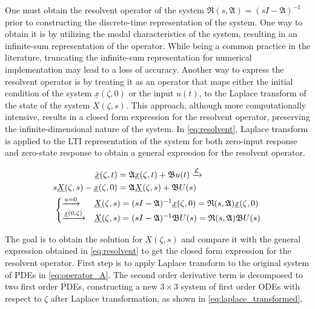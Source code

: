 One must obtain the resolvent operator of the system $\mathfrak{R}(s, \mathfrak{A}) = (sI-\mathfrak{A})^{-1}$ prior to constructing the discrete-time representation of the system. One way to obtain it is by utilizing the modal characteristics of the system, resulting in an infinite-sum representation of the operator. While being a common practice in the literature, truncating the infinite-sum representation for numerical implementation may lead to a loss of accuracy. Another way to express the resolvent operator is by treating it as an operator that maps either the initial condition of the system $\underline{x}(\zeta,0)$ or the input $u(t)$, to the Laplace transform of the state of the system $\underline{X}(\zeta, s)$. This approach, although more computationally intensive, results in a closed form expression for the resolvent operator, preserving the infinite-dimensional nature of the system. In \eqref{eq:resolvent}, Laplace transform is applied to the LTI representation of the system for both zero-input response and zero-state response to obtain a general expression for the resolvent operator.

\begin{equation} \label{eq:resolvent}
    \begin{aligned}
        \dot{\underline{x}}(\zeta, t) &= \mathfrak{A} \underline{x}(\zeta, t) + \mathfrak{B} u(t) \xrightarrow{\mathcal{L}}\\
        s \underline{X}(\zeta,s) - \underline{x}(\zeta,0) &= \mathfrak{A} \underline{X}(\zeta,s) + \mathfrak{B} U(s)\\
        &\hspace{-7.5em}\begin{cases}
            \xrightarrow{u = 0} &\underline{X}(\zeta,s) = (sI - \mathfrak{A})^{-1} \underline{x}(\zeta,0) = \mathfrak{R}(s, \mathfrak{A}) \underline{x}(\zeta,0)\\
            \xrightarrow{\underline{x}(0, \zeta)}& \underline{X}(\zeta,s) = (sI - \mathfrak{A})^{-1} \mathfrak{B} U(s) = \mathfrak{R}(s, \mathfrak{A}) \mathfrak{B} U(s)
        \end{cases}
    \end{aligned}
    \end{equation}
    
    The goal is to obtain the solution for $\underline{X}(\zeta, s)$ and compare it with the general expression obtained in \eqref{eq:resolvent} to get the closed form expression for the resolvent operator. First step is to apply Laplace transform to the original system of PDEs in \eqref{eq:operator_A}. The second order derivative term is decomposed to two first order PDEs, constructing a new $3 \times 3$ system of first order ODEs with respect to $\zeta$ after Laplace transformation, as shown in \eqref{eq:laplace_transformed}.
    

